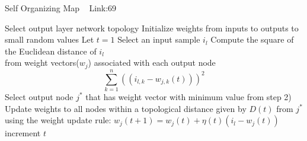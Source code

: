 \documentclass[a4paper]{article}
\begin{document}
\begin{algorithm}
   \caption{Self Organizing Map ~\cite{som2} Link:69 }
    \begin{algorithmic}[1]
    
    
    \State Select output layer network topology
    \State Initialize weights from inputs to outputs to small random values
    \State Let $t = 1$
    \State Select an input sample $i_{l}$
    \State Compute the square of the Euclidean distance of $i_{l}$ \\
    from weight vectors($w_{j}$) associated with each output node
    $$\operatorname*{\sum}_{k=1}^{n} ((i_{l,k} - w_{j,k} (t)))^{2}$$
    \State Select output node $j^{*}$ that has weight vector with minimum value from step 2)
    \State Update weights to all nodes within a topological distance given by $D(t)$ from $j^{*}$ using the weight update rule:
    $w_{j}(t+1) = w_{j}(t) + \eta (t) (i_{l} - w_{j} (t))$
    \State increment $t$
    
    
    \EndWhile
    
    
    
    \end{algorithmic}
\end{algorithm}
    
\end{document}
